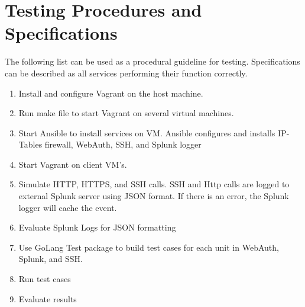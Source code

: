 \section{Testing Procedures and Specifications}
The following list can be used as a procedural guideline for testing. Specifications can be described as all services performing their function correctly.
\begin{enumerate}
\item Install and configure Vagrant on the host machine. 
\item Run make file to start Vagrant on several virtual machines.
\item Start Ansible to install services on VM. Ansible configures and installs IP-Tables firewall, WebAuth, SSH, and Splunk logger
\item Start Vagrant on client VM's.
\item Simulate HTTP, HTTPS, and SSH calls. SSH and Http calls are logged to external Splunk server using JSON format. If there is an error, the Splunk logger will cache the event.
\item Evaluate Splunk Logs for JSON formatting
\item Use GoLang Test package to build test cases for each unit in WebAuth, Splunk, and SSH.
\item Run test cases
\item Evaluate results
\end{enumerate}
